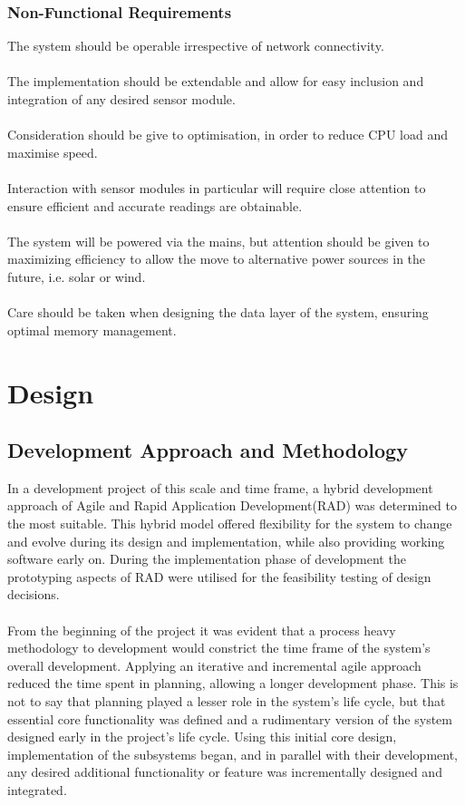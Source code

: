 \documentclass{article}
\begin{document}
\subsubsection{Non-Functional Requirements}
The system should be operable irrespective of network connectivity. \\\\ The implementation should be extendable and allow for easy inclusion and integration of any desired sensor module. \\\\ Consideration should be give to optimisation, in order to reduce CPU load and maximise speed. \\\\ Interaction with sensor modules in particular will require close attention to ensure efficient and accurate readings are obtainable. \\\\ The system will be powered via the mains, but attention should be given to maximizing efficiency to allow the move to alternative power sources in the future, i.e. solar or wind. \\\\ Care should be taken when designing the data layer of the system, ensuring optimal memory management.

\newpage
\section{Design}
\subsection{Development Approach and Methodology}
In a development project of this scale and time frame, a hybrid development approach of Agile and Rapid Application Development(RAD) was determined to the most suitable. This hybrid model offered flexibility for the system to change and evolve during its design and implementation, while also providing working software early on. During the implementation phase of development the prototyping aspects of RAD were utilised for the feasibility testing of design decisions. \\\\
From the beginning of the project it was evident that a process heavy methodology to development would constrict the time frame of the system\rq s overall development. Applying an iterative and incremental agile approach reduced the time spent in planning, allowing a longer development phase. This is not to say that planning played a lesser role in the system’s life cycle, but that essential core functionality was defined and a rudimentary version of the system designed early in the project\rq s life cycle. Using this initial core design, implementation of the subsystems began, and in parallel with their development, any desired additional functionality or feature was incrementally designed and integrated.
\end{document}
